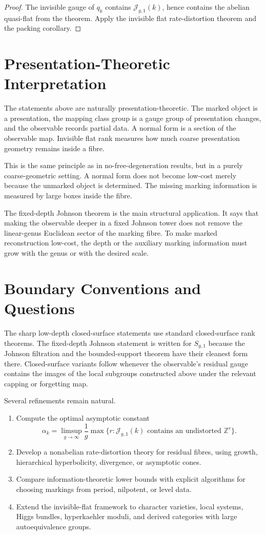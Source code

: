 \documentclass[11pt]{article}
\begin{document}
\begin{proof}
The invisible gauge of \(q_k\) contains \(\mathcal J_{g,1}(k)\), hence contains
the abelian quasi-flat from the theorem.  Apply the invisible flat
rate-distortion theorem and the packing corollary.
\end{proof}

\section{Presentation-Theoretic Interpretation}

The statements above are naturally presentation-theoretic.  The marked object is
a presentation, the mapping class group is a gauge group of presentation
changes, and the observable records partial data.  A normal form is a section of
the observable map.  Invisible flat rank measures how much coarse presentation
geometry remains inside a fibre.

This is the same principle as in no-free-degeneration results, but in a purely
coarse-geometric setting.  A normal form does not become low-cost merely because
the unmarked object is determined.  The missing marking information is measured
by large boxes inside the fibre.

The fixed-depth Johnson theorem is the main structural application.  It says
that making the observable deeper in a fixed Johnson tower does not remove the
linear-genus Euclidean sector of the marking fibre.  To make marked
reconstruction low-cost, the depth or the auxiliary marking information must
grow with the genus or with the desired scale.

\section{Boundary Conventions and Questions}

The sharp low-depth closed-surface statements use standard closed-surface rank
theorems.  The fixed-depth Johnson statement is written for \(S_{g,1}\) because
the Johnson filtration and the bounded-support theorem have their cleanest form
there.  Closed-surface variants follow whenever the observable's residual gauge
contains the images of the local subgroups constructed above under the relevant
capping or forgetting map.

Several refinements remain natural.
\begin{enumerate}[label=\textup{(\roman*)}]
\item Compute the optimal asymptotic constant
\[
\alpha_k=\limsup_{g\to\infty}\frac{1}{g}
\max\{r:\mathcal J_{g,1}(k)\text{ contains an undistorted }\mathbb Z^r\}.
\]
\item Develop a nonabelian rate-distortion theory for residual fibres, using
growth, hierarchical hyperbolicity, divergence, or asymptotic cones.
\item Compare information-theoretic lower bounds with explicit algorithms for
choosing markings from period, nilpotent, or level data.
\item Extend the invisible-flat framework to character varieties, local systems,
Higgs bundles, hyperkaehler moduli, and derived categories with large
autoequivalence groups.
\end{enumerate}
\end{document}
